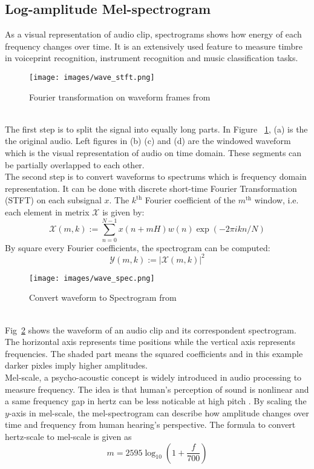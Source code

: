 \documentclass[a4paper, 11pt]{report}
\begin{document}
\subsection{Log-amplitude Mel-spectrogram}
As a visual representation of audio clip, spectrograms  shows how energy of each frequency changes over time. It is an extensively used feature to measure timbre in voiceprint recognition, instrument recognition and music classification tasks. 
 \begin{figure}[h]
 	\caption{Fourier transformation on waveform frames from \protect{}}
 	\centering
 	\texttt{[image: images/wave\_stft.png]}
 	\label{fig:wave_stft}
 \end{figure}\\
The first step is to split the signal into equally long parts. In Figure ~\ref{fig:wave_stft}, (a) is the the original audio. Left figures in (b) (c) and (d) are the windowed waveform which is the visual representation of audio on time domain. These segments can be partially overlapped to each other.\\
The second step is to convert waveforms to spectrums which is frequency domain representation. It can be done with discrete short-time Fourier Transformation (STFT) on each subsignal $x$. The $k^{\mathrm{th}}$ Fourier coefficient of the $m^{\mathrm{th}}$ window, i.e. each element in metrix $\mathcal{X}$ is given by:
$$\mathcal{X}(m, k) :=\sum_{n=0}^{N-1} x(n+m H) w(n) \exp (-2 \pi i k n / N)$$
By square every Fourier coefficients, the spectrogram can be computed:
$$\mathcal{Y}(m, k) :=|\mathcal{X}(m, k)|^{2}$$
 \begin{figure}[h]
 	\caption{Convert waveform to Spectrogram from \protect{} }
 	\centering
 	\texttt{[image: images/wave\_spec.png]}
 	\label{fig:wave_spec}
 \end{figure}\\
 Fig~\ref{fig:wave_spec} shows the waveform of an audio clip and its correspondent spectrogram. The horizontal axis represents  time positions while the vertical axis represents frequencies. The shaded part means the squared coefficients and in this example darker pixles imply higher amplitudes.\\
Mel-scale, a psycho-acoustic concept is widely introduced in audio processing to measure frequency. The idea is that human's perception of sound is nonlinear and a same frequency gap in hertz can be less noticable at high pitch \cite{PhysRevLett.110.044301}. By scaling the $y$-axis in mel-scale, the mel-spectrogram can describe how amplitude changes over time and frequency from human hearing's perspective. The formula to convert hertz-scale to mel-scale is given as
$$m=2595 \log _{10}\left(1+\frac{f}{700}\right)$$
\end{document}
